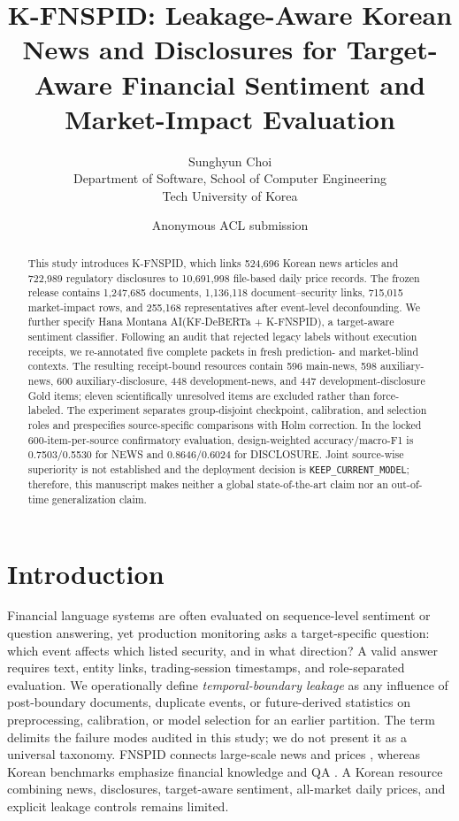 \documentclass[11pt]{article}
\title{K-FNSPID: Leakage-Aware Korean News and Disclosures for Target-Aware Financial Sentiment and Market-Impact Evaluation}
\author{Sunghyun Choi\\
    Department of Software, School of Computer Engineering\\
    Tech University of Korea}
\author{Anonymous ACL submission}
\newcommand{\system}{Hana Montana AI(KF-DeBERTa + K-FNSPID)}
\begin{document}
\maketitle

\begin{abstract}
This study introduces K-FNSPID, which links 524,696 Korean news articles and 722,989 regulatory disclosures to 10,691,998 file-based daily price records. The frozen release contains 1,247,685 documents, 1,136,118 document--security links, 715,015 market-impact rows, and 255,168 representatives after event-level deconfounding. We further specify \system{}, a target-aware sentiment classifier. Following an audit that rejected legacy labels without execution receipts, we re-annotated five complete packets in fresh prediction- and market-blind contexts. The resulting receipt-bound resources contain 596 main-news, 598 auxiliary-news, 600 auxiliary-disclosure, 448 development-news, and 447 development-disclosure Gold items; eleven scientifically unresolved items are excluded rather than force-labeled. The experiment separates group-disjoint checkpoint, calibration, and selection roles and prespecifies source-specific comparisons with Holm correction. In the locked 600-item-per-source confirmatory evaluation, design-weighted accuracy/macro-F1 is 0.7503/0.5530 for NEWS and 0.8646/0.6024 for DISCLOSURE. Joint source-wise superiority is not established and the deployment decision is \texttt{KEEP\_CURRENT\_MODEL}; therefore, this manuscript makes neither a global state-of-the-art claim nor an out-of-time generalization claim.
\end{abstract}

\section{Introduction}

Financial language systems are often evaluated on sequence-level sentiment or question answering, yet production monitoring asks a target-specific question: which event affects which listed security, and in what direction? A valid answer requires text, entity links, trading-session timestamps, and role-separated evaluation. We operationally define \emph{temporal-boundary leakage} as any influence of post-boundary documents, duplicate events, or future-derived statistics on preprocessing, calibration, or model selection for an earlier partition. The term delimits the failure modes audited in this study; we do not present it as a universal taxonomy. FNSPID connects large-scale news and prices \citep{dong-etal-2024-fnspid}, whereas Korean benchmarks emphasize financial knowledge and QA \citep{son-etal-2024-krx,son-etal-2025-finkrx}. A Korean resource combining news, disclosures, target-aware sentiment, all-market daily prices, and explicit leakage controls remains limited.
\end{document}
